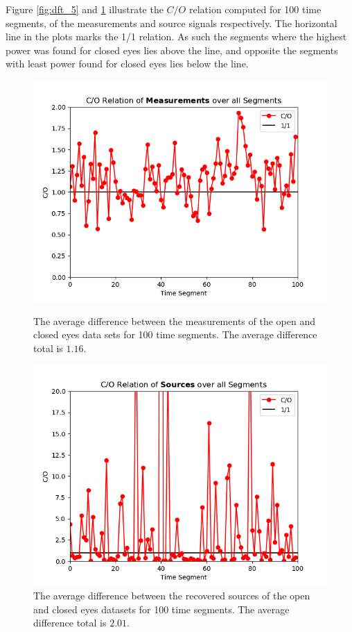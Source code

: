Figure \ref{fig:dft_5} and \ref{fig:dft_6} illustrate the $C/O$ relation computed for 100 time segments, of the measurements and source signals respectively. 
The horizontal line in the plots marks the 1/1 relation.
As such the segments where the highest power was found for closed eyes lies above the line, and opposite the segments with least power found for closed eyes lies below the line.      
\begin{figure}[H]
\begin{widepage}
    \begin{minipage}[t]{.49\textwidth}
\centering
\includegraphics[width=1\linewidth]{figures/ch_7/DFT_Y_Difference.png}
\caption{The average difference between the measurements of the open and closed eyes data sets for 100 time segments. The average difference total is $1.16$.}
\label{fig:dft_5}
\end{minipage} 
\hspace{.5cm}
\begin{minipage}[t]{.49\textwidth}
\centering
\includegraphics[width=1\linewidth]{figures/ch_7/DFT_X_Difference.png}
\caption{The average difference between the recovered sources of the open and closed eyes datasets for 100 time segments. The average difference total is $2.01$.}
	\label{fig:dft_6}
    \end{minipage}
\end{widepage}
\end{figure}
